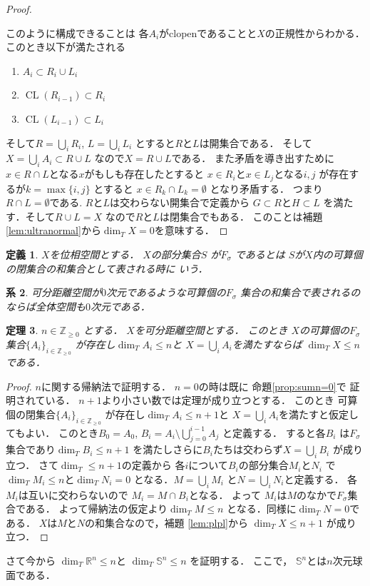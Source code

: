 \documentclass[leqno, a4paper, 12pt]{jsarticle}
\newtheorem{thm}{定理}
\newtheorem{cor}[thm]{系}
\newtheorem{df}[thm]{定義}
\newcommand{\zz}{\mathbb{Z}}
\newcommand{\rr}{\mathbb{R}}
\DeclareMathOperator{\cl}{CL}
\begin{document}
\begin{proof}
\begin{enumerate}
\end{enumerate}
このように構成できることは
各$A_{i}$がclopenであることと$X$の正規性からわかる．
このとき以下が満たされる
\begin{enumerate}
\item $A_{i}\subset R_{i}\cup L_{i}$
\item 
$\cl(R_{i-1})\subset R_{i}$

\item 
$\cl(L_{i-1})\subset L_{i}$
\end{enumerate}
そして$R=\bigcup_{i}R_{i}$, 
$L=\bigcup_{i}L_{i}$
とすると$R$と$L$は開集合である．
そして
$X=\bigcup_{i}A_{i}\subset R\cup L$
なので$X=R\cup L$である．
また矛盾を導き出すために$x\in R\cap L$となる$x$がもしも存在したとすると
$x\in R_{i}$と$x\in L_{j}$となる$i, j$
が存在するが$k=\max\{i, j\}$
とすると
$x\in R_{k}\cap L_{k}=\emptyset$
となり矛盾する．
つまり$R\cap L=\emptyset$である. 
$R$と$L$は交わらない開集合で定義から
$G\subset R$と$H\subset L$
を満たす．そして$R\cup L=X$
なので$R$と$L$は閉集合でもある．
このことは補題 \ref{lem:ultranormal}から$\dim_{T}X=0$を意味する．
\end{proof}


\begin{df}
$X$を位相空間とする．
$X$の部分集合$S$
が$F_{\sigma}$
であるとは
$S$が$X$内の可算個の閉集合の和集合として表される時に
いう．
\end{df}

\begin{cor}
可分距離空間が$0$次元であるような可算個の$F_{\sigma}$
集合の和集合で表されるのならば全体空間も$0$次元である．
\end{cor}


\begin{thm}\label{thm:sumsum}
$n\in \zz_{\ge 0}$
とする．
$X$を可分距離空間とする．
このとき
$X$の可算個の$F_{\sigma}$集合$\{A_{i}\}_{i\in \zz_{\ge 0}}$
が存在し$\dim_{T}A_{i}\le n$と
$X=\bigcup_{i}A_{i}$を満たすならば
$\dim_{T}X\le n$である．
\end{thm}
\begin{proof}
$n$に関する帰納法で証明する．
$n=0$の時は既に
命題\ref{prop:sumn=0}で
証明されている．
$n+1$より小さい数では定理が成り立つとする．
このとき
可算個の閉集合$\{A_{i}\}_{i\in \zz_{\ge 0}}$
が存在し$\dim_{T}A_{i}\le n+1$と
$X=\bigcup_{i}A_{i}$を満たすと仮定してもよい．
このとき$B_{0}=A_{0}$, 
$B_{i}=A_{i}\setminus \bigcup_{j=0}^{i-1}A_{j}$
と定義する．
すると各$B_{i}$
は$F_{\sigma}$集合であり$\dim_{T}B_{i}\le n+1$
を満たしさらに$B_{i}$たちは交わらず$X=\bigcup_{i}B_{i}$
が成り立つ．
さて$\dim_{T}\le n+1$の定義から
各$i$について$B_{i}$の部分集合$M_{i}$と$N_{i}$
で$\dim_{T}M_{i}\le n$と$\dim_{T}N_{i}=0$
となる．$M=\bigcup_{i}M_{i}$
と$N=\bigcup_{i}N_{i}$と定義する．
各$M_{i}$は互いに交わらないので
$M_{i}=M\cap B_{i}$となる．
よって
$M_{i}$は$M$のなかで$F_{\sigma}$集合である．
よって帰納法の仮定より$\dim_{T}M\le n$
となる．同様に$\dim_{T}N=0$である．
$X$は$M$と$N$の和集合なので，補題 \ref{lem:plpl}から
$\dim_{T}X\le n+1$
が成り立つ．
\end{proof}
さて今から
$\dim_{T}\rr^{n}\le n$と
$\dim_{T}\mathbb{S}^{n}\le n$
を証明する．
ここで，
$\mathbb{S}^{n}$とは$n$次元球面である．
\end{document}
